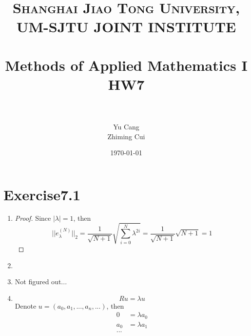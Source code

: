 \documentclass[paper=a4, fontsize=11pt]{scrartcl} %
\title{	
\normalfont \normalsize 
\textsc{Shanghai Jiao Tong University, UM-SJTU JOINT INSTITUTE} \\ [25pt] %
\horrule{0.5pt} \\[0.4cm] %
\huge Methods of Applied Mathematics I\\ HW7 \\ %
\horrule{2pt} \\[0.5cm] %
}
\author{Yu Cang \quad 018370210001\\ Zhiming Cui \quad 017370910006} %
\date{\normalsize \today} %
\numberwithin{equation}{section} %
\numberwithin{figure}{section} %
\numberwithin{table}{section} %
\begin{document}
\maketitle %

\section{Exercise7.1}
	\begin{enumerate}
		\item 
			\begin{proof}
				Since $|\lambda|=1$, then
				\begin{equation}
					||e_\lambda^{(N)}||_2 = \frac{1}{\sqrt{N+1}} \sqrt{\sum_{i=0}^{N} \lambda^{2i}} =  \frac{1}{\sqrt{N+1}} \sqrt{N+1} = 1
				\end{equation}
			\end{proof}
		\item 
			
		\item 
			Not figured out...
		\item
			\begin{equation}
				Ru = \lambda u
			\end{equation} 
			Denote $u = (a_0, a_1, ..., a_n, ...)$, then
			\begin{equation}
				\begin{aligned}
					0 &= \lambda a_0\\
					a_0 &= \lambda a_1\\
					...\\
				\end{aligned}
			\end{equation}
	\end{enumerate}
\end{document}
